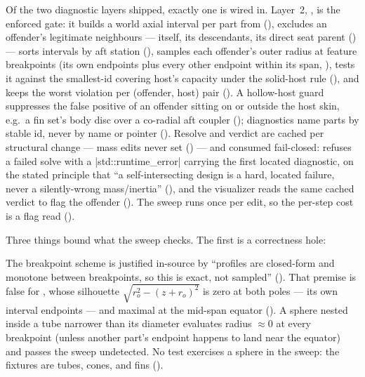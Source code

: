 Of the two diagnostic layers shipped, exactly one is wired in. Layer~2, , is
the enforced gate: it builds a world axial interval per part from 
(), excludes an offender's legitimate neighbours --- itself,
its descendants, its direct seat parent () --- sorts intervals
by aft station (), samples each offender's outer radius at
feature breakpoints (its own endpoints plus every other endpoint within its span,
), tests it against the smallest-id covering host's capacity
under the solid-host rule (), and keeps the worst violation
per (offender, host) pair (). A hollow-host guard suppresses
the false positive of an offender sitting on or outside the host skin, e.g.\ a fin set's body disc
over a co-radial aft coupler (); diagnostics name parts by
stable id, never by name or pointer (). Resolve and verdict are
cached per structural change --- mass edits never set 
() --- and consumed fail-closed:  refuses
a failed solve with a \cppinline|std::runtime_error| carrying the first located diagnostic, on the
stated principle that ``a self-intersecting design is a hard, located failure, never a
silently-wrong mass/inertia'' (), and the visualizer reads the same
cached verdict to flag the offender (). The sweep runs once
per edit, so the per-step cost is a flag read ().

Three things bound what the sweep checks. The first is a correctness hole:

\begin{hardfail}
The breakpoint scheme is justified in-source by ``profiles are closed-form and monotone between
breakpoints, so this is exact, not sampled'' (). That premise
is false for , whose silhouette $\sqrt{r_o^2 - (z + r_o)^2}$ is zero at both
poles --- its own interval endpoints --- and maximal at the mid-span equator
(). A sphere nested inside a tube narrower than its diameter
evaluates radius $\approx 0$ at every breakpoint (unless another part's endpoint happens to land
near the equator) and passes the sweep undetected. No test exercises a sphere in the sweep: the
fixtures are tubes, cones, and fins (). \fail
\end{hardfail}

